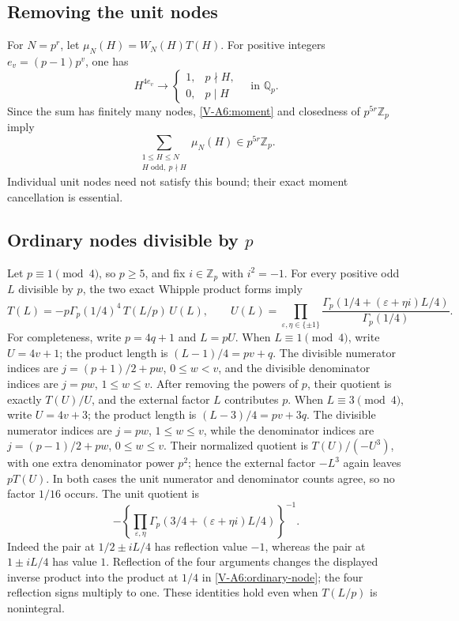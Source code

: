 \documentclass[11pt,letterpaper]{article}
\numberwithin{equation}{section}
\begin{document}
\subsection{Removing the unit nodes}
For $N=p^r$, let $\mu_N(H)=W_N(H)T(H)$. For positive integers
$e_v=(p-1)p^v$, one has
\[
H^{4e_v}\longrightarrow
\begin{cases}1,&p\nmid H,\\0,&p\mid H\end{cases}
\quad\text{in }\mathbb Q_p.
\]
Since the sum has finitely many nodes, \eqref{V-A6:moment} and closedness
of $p^{5r}\mathbb Z_p$ imply
\begin{equation}\label{V-A6:units}
\sum_{\substack{1\le H\le N\\H\text{ odd},\ p\nmid H}}
\mu_N(H)\in p^{5r}\mathbb Z_p.
\end{equation}
Individual unit nodes need not satisfy this bound; their exact
moment cancellation is essential.

\subsection{Ordinary nodes divisible by $p$}
Let $p\equiv1\pmod4$, so $p\ge5$, and fix $i\in\mathbb Z_p$ with
$i^2=-1$. For every positive odd $L$ divisible by $p$, the two exact
Whipple product forms imply
\begin{equation}\label{V-A6:ordinary-node}
T(L)=-p\Gamma_p(1/4)^4\,T(L/p)\,U(L),
\qquad
U(L)=\prod_{\varepsilon,\eta\in\{\pm1\}}
\frac{\Gamma_p(1/4+(\varepsilon+\eta i)L/4)}{\Gamma_p(1/4)}.
\end{equation}
For completeness, write $p=4q+1$ and $L=pU$.
When $L\equiv1\pmod4$, write $U=4v+1$; the product length is
$(L-1)/4=pv+q$. The divisible numerator indices are
$j=(p+1)/2+pw$, $0\le w<v$, and the divisible denominator
indices are $j=pw$, $1\le w\le v$. After removing the powers of
$p$, their quotient is exactly $T(U)/U$, and the external factor
$L$ contributes $p$. When $L\equiv3\pmod4$, write $U=4v+3$;
the product length is $(L-3)/4=pv+3q$. The divisible numerator
indices are $j=pw$, $1\le w\le v$, while the denominator indices
are $j=(p-1)/2+pw$, $0\le w\le v$. Their normalized quotient
is $T(U)/(-U^3)$, with one extra denominator power $p^2$; hence
the external factor $-L^3$ again leaves $pT(U)$. In both cases the unit
numerator and denominator counts agree, so no factor $1/16$ occurs.
The unit quotient is
\[
-\left\{\prod_{\varepsilon,\eta}
\Gamma_p(3/4+(\varepsilon+\eta i)L/4)\right\}^{-1}.
\]
Indeed the pair at $1/2\pm iL/4$ has reflection value $-1$, whereas
the pair at $1\pm iL/4$ has value $1$. Reflection of the four
arguments changes the displayed inverse product into the product at
$1/4$ in \eqref{V-A6:ordinary-node}; the four reflection signs multiply
to one. These identities hold even when $T(L/p)$ is nonintegral.
\end{document}
